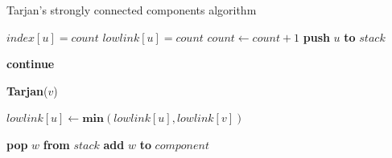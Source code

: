 \begin{algorithm}
\caption{Tarjan's strongly connected components algorithm}\label{algorithm:tarjan}
\begin{algorithmic}[1]


\State $index[u] = count$
\State $lowlink[u] = count$
\State $count \gets count + 1$
\State \textbf{push} $u$ \textbf{to} $stack$


		\State \textbf{continue}
	\EndIf
	
		\State \textbf{Tarjan}($v$)
	\EndIf
	
	\State $lowlink[u] \gets \textbf{min}(lowlink[u],lowlink[v])$
\EndFor

	\Repeat
		\State \textbf{pop} $w$ \textbf{from} $stack$
		\State \textbf{add} $w$ \textbf{to} $component$
\EndIf

\EndFunction
\end{algorithmic}
\end{algorithm}


